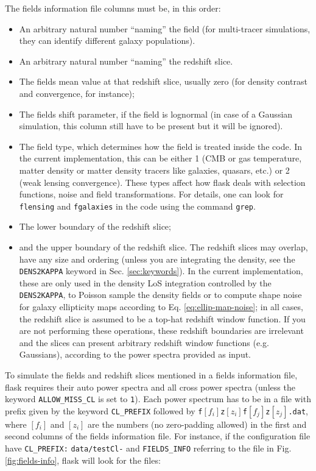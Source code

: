\documentclass[12pt]{book} %
\begin{document}
The fields information file columns must be, in this order:
\begin{itemize}
\item An arbitrary natural number ``naming'' the field (for multi-tracer simulations, they can identify 
  different galaxy populations).
\item An arbitrary natural number ``naming'' the redshift slice.
\item The fields mean value at that redshift slice, usually zero (for density contrast and convergence, for instance);
\item The fields shift parameter, if the field is lognormal (in case of a Gaussian simulation, this column 
  still have to be present but it will be ignored).
\item The field type, which determines how the field is treated inside the code. In the current 
  implementation, this can be either 1 (CMB or gas temperature, matter density or matter density tracers like 
  galaxies, quasars, etc.) or 2 (weak lensing convergence). These types affect how {\sc flask} deals with 
  selection functions, noise and field transformations. For details, one can look for {\tt flensing} and 
  {\tt fgalaxies} in the code using the command {\tt grep}.
\item The lower boundary of the redshift slice;
\item and the upper boundary of the redshift slice. The redshift slices may overlap, have any size and ordering 
  (unless you are integrating the density, see the {\tt DENS2KAPPA} keyword in Sec. \ref{sec:keywords}). 
  In the current implementation, these are only used in the density LoS integration controlled by the {\tt DENS2KAPPA}, 
  to Poisson sample the density fields or to compute shape noise for galaxy ellipticity maps according to 
  Eq. \ref{eq:ellip-map-noise}; in all cases, the redshift slice is assumed to be a top-hat 
  redshift window function. If you are not performing these operations, these redshift boundaries are 
  irrelevant and the slices can present arbitrary redshift window functions (e.g. Gaussians), according to 
  the power spectra provided as input.
\end{itemize}

To simulate the fields and redshift slices mentioned in a fields information file, 
{\sc flask} requires their auto power spectra and all cross power spectra (unless 
the keyword {\tt ALLOW\_MISS\_CL} is set to {\tt 1}). Each power spectrum has to 
be in a file with prefix given by the keyword {\tt CL\_PREFIX} followed by 
{\tt f}$[f_i]${\tt z}$[z_i]${\tt f}$[f_j]${\tt z}$[z_j]${\tt .dat}, where 
$[f_i]$ and $[z_i]$ are the numbers (no zero-padding allowed) in the first and 
second columns of the fields information file. For instance, if 
the configuration file have {\tt CL\_PREFIX:} {\tt data/testCl-} and 
{\tt FIELDS\_INFO} referring to the file in Fig. \ref{fig:fields-info}, 
{\sc flask} will look for the files:
\end{document}
